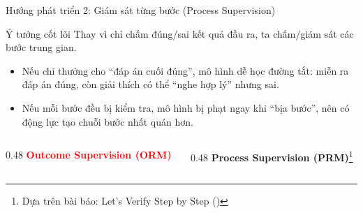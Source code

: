 \begin{frame}{Hướng phát triển 2: Giám sát từng bước (Process Supervision)}
    \begin{block}{Ý tưởng cốt lõi}
        Thay vì chỉ chấm đúng/sai kết quả đầu ra, ta chấm/giám sát các bước trung gian.
        \begin{itemize}
            \item Nếu chỉ thưởng cho “đáp án cuối đúng”, mô hình dễ học đường tắt: miễn ra đáp án đúng, còn giải thích có thể “nghe hợp lý” nhưng sai.
            \item Nếu mỗi bước đều bị kiểm tra, mô hình bị phạt ngay khi “bịa bước”, nên có động lực tạo chuỗi bước nhất quán hơn.
        \end{itemize}
    \end{block}
    \vspace{0.5cm}
    
    \begin{columns}[t]
        \begin{column}{0.48\textwidth}
            \centering
            \textbf{\textcolor{red}{Outcome Supervision (ORM)}}
            \vspace{0.2cm}
            
        \end{column}
        
        \vrule{}
        
        \begin{column}{0.48\textwidth}
            \centering
            \textbf{\textcolor{green!60!black}{Process Supervision (PRM)}}\footnote{Dựa trên bài báo: Let's Verify Step by Step (\cite{Lightman2023})}
            \vspace{0.2cm}
            

\end{column}
\end{columns}
\end{frame}
